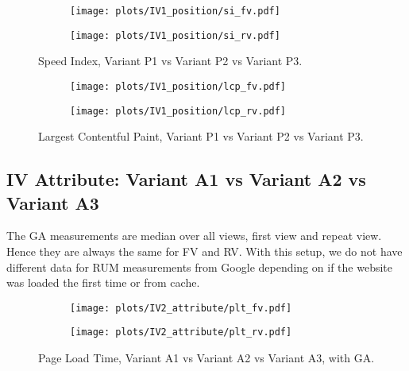 \clearpage

\begin{figure}
	\centering
	\begin{subfigure}{.5\textwidth}
		\centering
		\texttt{[image: plots/IV1\_position/si\_fv.pdf]}
		\label{fig:sub1}
	\end{subfigure}%
	\begin{subfigure}{.5\textwidth}
		\centering
		\texttt{[image: plots/IV1\_position/si\_rv.pdf]}
		\label{fig:sub2}
	\end{subfigure}
	\caption{Speed Index, Variant P1 vs Variant P2 vs Variant P3.}
	\label{figure:plt_original_test}
\end{figure}


\begin{figure}
	\centering
	\begin{subfigure}{.5\textwidth}
		\centering
		\texttt{[image: plots/IV1\_position/lcp\_fv.pdf]}
		\label{fig:sub1}
	\end{subfigure}%
	\begin{subfigure}{.5\textwidth}
		\centering
		\texttt{[image: plots/IV1\_position/lcp\_rv.pdf]}
		\label{fig:sub2}
	\end{subfigure}
	\caption{Largest Contentful Paint, Variant P1 vs Variant P2 vs Variant P3.}
	\label{figure:plt_original_test}
\end{figure}








\subsection{IV Attribute: Variant A1 vs Variant A2 vs Variant A3}


The GA measurements are median over all views, first view and repeat view.
Hence they are always the same for FV and RV.
With this setup, we do not have different data for RUM measurements from Google depending on if the website was loaded the first time or from cache.




\begin{figure}
	\centering
	\begin{subfigure}{.5\textwidth}
		\centering
		\texttt{[image: plots/IV2\_attribute/plt\_fv.pdf]}
		\label{fig:sub1}
	\end{subfigure}%
	\begin{subfigure}{.5\textwidth}
		\centering
		\texttt{[image: plots/IV2\_attribute/plt\_rv.pdf]}
		\label{fig:sub2}
	\end{subfigure}
	\caption{Page Load Time, Variant A1 vs Variant A2 vs Variant A3, with GA.}
	\label{figure:plt_original_test}
\end{figure}


